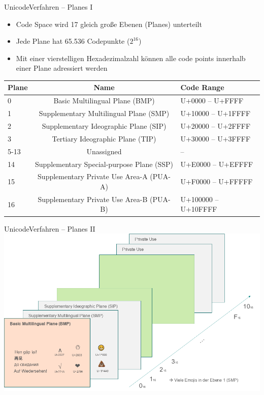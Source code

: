 \documentclass[xelatex,aspectratio=169]{beamer}
\begin{document}
\begin{frame}{Unicode}{Verfahren -- Planes I}
    \begin{itemize}
        \item Code Space wird 17 gleich große Ebenen (Planes) unterteilt
        \item Jede Plane hat 65.536 Codepunkte ($2^{16}$)
        \item Mit einer vierstelligen Hexadezimalzahl können alle code points innerhalb einer Plane adressiert werden
    \end{itemize}
    \centering
    \begin{tabular}{lcl}
        \toprule
        Plane & Name                                      & Code Range           \\
        \midrule
        0     & Basic Multilingual Plane (BMP)            & U+0000 -- U+FFFF     \\
        1     & Supplementary Multilingual Plane (SMP)    & U+10000 -- U+1FFFF   \\
        2     & Supplementary Ideographic Plane (SIP)     & U+20000 -- U+2FFFF   \\
        3     & Tertiary Ideographic Plane (TIP)          & U+30000 -- U+3FFFF   \\
        5-13  & Unassigned                                & --                   \\
        14    & Supplementary Special-purpose Plane (SSP) & U+E0000 -- U+EFFFF   \\
        15    & Supplementary Private Use Area-A (PUA-A)  & U+F0000 -- U+FFFFF   \\
        16    & Supplementary Private Use Area-B (PUA-B)  & U+100000 -- U+10FFFF \\
        \bottomrule
    \end{tabular}
\end{frame}
\begin{frame}{Unicode}{Verfahren -- Planes II}
    \includegraphics[height=.8\textheight]{img/codierung_planes.png}
\end{frame}
\end{document}
